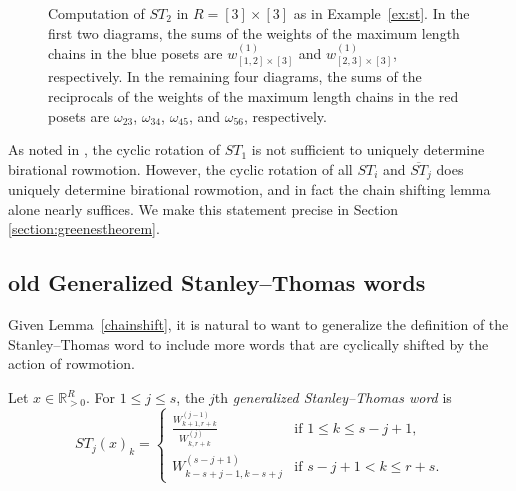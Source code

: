 \documentclass[ALCO,Unicode,published]{cedram}
\numberwithin{equation}{section}
\newcommand{\ST}{ST}
\begin{document}
\begin{figure}
    \caption{Computation of $ST_2$ in $R=[3] \times [3]$ as in Example~\ref{ex:st}. In the first two diagrams, the sums of the weights of the maximum length chains in the blue posets are $w_{[1,2] \times [3]}^{(1)}$ and $w_{[2,3] \times [3]}^{(1)}$, respectively. In the remaining four diagrams, the sums of the reciprocals of the weights of the maximum length chains in the red posets are $\omega_{23}$, $\omega_{34}$, $\omega_{45}$, and $\omega_{56}$, respectively.}
%   
    \label{fig:st}
\end{figure}

As noted in \cite{josephroby1}, the cyclic rotation of $ST_1$ is not sufficient to uniquely determine birational rowmotion. However, the cyclic rotation of all $ST_i$ and $\overline{ST}_j$ does uniquely determine birational rowmotion, and in fact the chain shifting lemma alone nearly suffices. We make this statement precise in Section \ref{section:greenestheorem}.


\iffalse
\subsection{old Generalized Stanley--Thomas words}

Given Lemma~\ref{chainshift}, it is natural to want to generalize the definition of the Stanley--Thomas word to include more words that are cyclically shifted by the action of rowmotion. 


\begin{Def}
Let $x \in \mathbb{R}^R_{>0}$. For $1 \leq j \leq s$, the $j$th \emph{generalized Stanley--Thomas word} is
\[\ST_j(x)_k = \begin{cases} \frac{ W_{k+1,r+k}^{(j-1)} }{ W_{k,r+k}^{(j)} } &\text{if } 1 \leq k \leq s-j+1, \\ W_{k-s+j-1,k-s+j}^{(s-j+1)} &\text{if } s-j+1 < k \leq r+s. \end{cases}\]
\end{Def}
\end{document}
